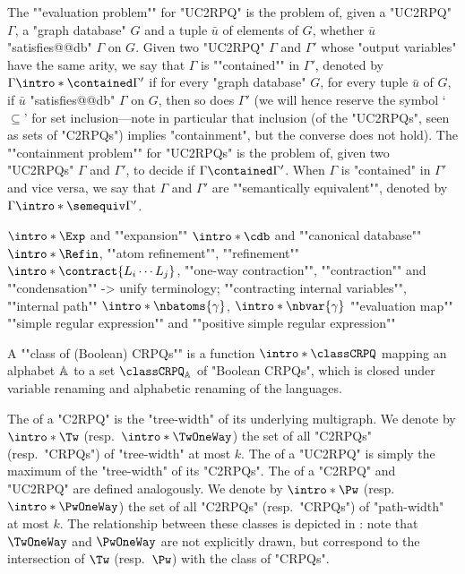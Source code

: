 \AP %
The ""evaluation problem"" for "UC2RPQ" is the problem of, given
a "UC2RPQ" $\Gamma$, a "graph database" $G$ and a tuple $\bar u$ of elements of $G$,
whether $\bar u$ "satisfies@@db" $\Gamma$ on $G$. 
Given two "UC2RPQ" $\Gamma$
and $\Gamma'$ whose "output variables" have the same arity,
we say that $\Gamma$ is \AP""contained"" in $\Gamma'$,
denoted by $\Gamma \intro*\contained \Gamma'$ if
for every "graph database" $G$, for every tuple $\bar u$ of $G$,
if $\bar u$ "satisfies@@db" $\Gamma$ on $G$, then so does $\Gamma'$ (we will hence reserve the symbol `$\subseteq$' for set inclusion---note in particular that inclusion (of the "UC2RPQs", seen as sets of "C2RPQs") implies "containment", but the converse does not hold). 
The \AP""containment problem"" for "UC2RPQs" is the problem of, given
two "UC2RPQs" $\Gamma$ and $\Gamma'$, to decide if $\Gamma \contained \Gamma'$.
When $\Gamma$ is "contained" in $\Gamma'$ and vice versa, we say that
$\Gamma$ and $\Gamma'$ are \AP""semantically equivalent"", denoted by
$\Gamma \intro*\semequiv \Gamma'$. 

\begin{itemize}
	\itemAP $\intro*\Exp$ and ""expansion""
	\itemAP $\intro*\cdb$ and ""canonical database""
	\itemAP $\intro*\Refin$, ""atom refinement"", ""refinement""
	\itemAP $\intro*\contract{L_i \cdots L_{j}}$, ""one-way contraction"", ""contraction"" and ""condensation"" -> unify terminology; ""contracting internal variables"", ""internal path""
	\itemAP $\intro*\nbatoms{\gamma}$, $\intro*\nbvar{\gamma}$
	\itemAP ""evaluation map""
	\itemAP ""simple regular expression"" and ""positive simple regular expression""
\end{itemize}

A \AP""class of (Boolean) CRPQs"" is a function \AP$\intro*\classCRPQ$ mapping an alphabet $\mathbb{A}$ 
to a set $\classCRPQ_{\A}$ of "Boolean CRPQs", which is closed under variable renaming and alphabetic
renaming of the languages.

The  of a "C2RPQ" is the "tree-width" of its underlying multigraph. 
We denote by $\intro*\Tw$ (resp.\ $\intro*\TwOneWay$) the set of all "C2RPQs" (resp.\ "CRPQs") of "tree-width" at most $k$. The  of a "UC2RPQ" is simply the maximum of the "tree-width" of its "C2RPQs".
\AP The  of a "C2RPQ" and "UC2RPQ" are defined analogously. We denote by \AP$\intro*\Pw$ (resp.\ $\intro*\PwOneWay$) the set of all "C2RPQs" (resp.\ "CRPQs") of "path-width" at most $k$. The relationship between these classes is depicted in :
note that $\TwOneWay$ and $\PwOneWay$ are not explicitly drawn, but correspond to the
intersection of $\Tw$ (resp.\ $\Pw$) with the class of "CRPQs".

